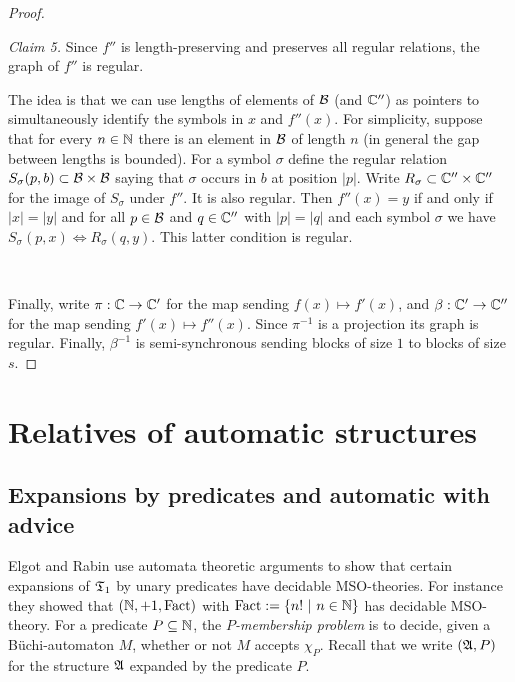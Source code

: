\begin{proof}
\

\noindent
{\em Claim 5.} Since $f''$ is length-preserving and preserves all regular relations, the graph of $f''$ is regular. 

The idea is that we can use lengths of elements of ${\mathcal B}$ (and $\mathbb{C}''$) as pointers to simultaneously identify the symbols in $x$ and $f''(x)$. For simplicity, suppose that for every $n \in \mathbb{N}$ there is an element in ${\mathcal B}$  of length $n$ (in general the gap between lengths is bounded). For a symbol $\sigma$ define the regular relation $S_\sigma(p,b) \subset {\mathcal B} \times {\mathcal B}$ saying that $\sigma$ occurs in $b$ at position $|p|$. Write $R_\sigma \subset \mathbb{C}'' \times \mathbb{C}''$ for the image of $S_\sigma$ under $f''$. It is also regular. Then $f''(x) = y$ if and only if $|x| = |y|$ and for all $p \in {\mathcal B}$
and $q \in \mathbb{C}''$ with $|p| = |q|$ and each symbol $\sigma$ we have $S_\sigma(p,x) \iff R_\sigma(q,y)$. This latter condition is regular.

\


Finally, write $\pi:\mathbb{C} \to \mathbb{C}'$ for the map sending $f(x) \mapsto f'(x)$, and $\beta:\mathbb{C}' \to \mathbb{C}''$ for the map sending $f'(x) \mapsto f''(x)$.
Since $\pi^{-1}$ is a projection its graph is regular.
Finally, $\beta^{-1}$ is semi-synchronous sending blocks of size $1$ to blocks of size $s$.
\end{proof}



\section{Relatives of automatic structures}  \label{AS:sec:gen} 

\subsection{Expansions by predicates and automatic with advice}

 
Elgot and Rabin \cite{ElRa66} use automata theoretic arguments to show that certain expansions of $\mathfrak{T}_1$ by unary
predicates have decidable MSO-theories.  For instance they showed that $(\mathbb{N},+1,\textrm{Fact})$
with $\textrm{Fact} := \{n! \ \vert \  n \in \mathbb{N}\}$ has decidable MSO-theory.  For a predicate $P \subseteq \mathbb{N}$, the {\em $P$-membership problem} is to decide, given a B\"uchi-automaton $M$,  whether or not $M$ accepts $\chi_P$. Recall that we write $(\mathfrak{A},P)$ for the structure $\mathfrak{A}$ expanded by the predicate $P$.

